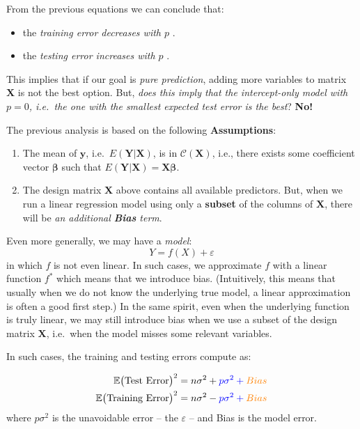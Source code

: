 \documentclass[
]{book}
\begin{document}
From the previous equations we can conclude that:

\begin{itemize}
\item
  the \emph{training error decreases with \(p\)} .
\item
  the \emph{testing error increases with \(p\)} .
\end{itemize}

This implies that if our goal is \emph{pure prediction}, adding more variables to matrix \(\mathbf{X}\) is not the best option. But, \emph{does this imply that the intercept-only model with \(p=0\), i.e.~the one with the smallest expected test error is the best}? \textbf{No!}

The previous analysis is based on the following \textbf{Assumptions}:

\begin{enumerate}
\def\labelenumi{\arabic{enumi}.}
\item
  The mean of \(\mathbf{y}\), i.e.~\(E(\mathbf{Y}|\mathbf{X})\), is in \(\mathcal{C}(\mathbf{X})\), i.e., there exists some coefficient vector \(\mathbf{\beta}\) such that \(E(\mathbf{Y}|\mathbf{X}) = \mathbf{X}\mathbf{\beta}\).
\item
  The design matrix \(\mathbf{X}\) above contains all available predictors. But, when we run a linear regression model using only a \textbf{subset} of the columns of \(\mathbf{X}\), there will be \emph{an additional \textbf{Bias} term}.
\end{enumerate}

Even more generally, we may have a \emph{model}:
\[Y = f(X) + \varepsilon\]
in which \(f\) is not even linear. In such cases, we approximate \(f\) with a linear function \(f^*\) which means that we introduce bias. (Intuitively, this means that usually when we do not know the underlying true model, a linear approximation is often a good first step.) In the same spirit, even when the underlying function is truly linear, we may still introduce bias when we use a subset of the design matrix \(\mathbf{X}\), i.e.~when the model misses some relevant variables.

In such cases, the training and testing errors compute as:

\begin{align*}
\mathbb{E}\bigl(\text{Test Error}\bigr)^2 &= n\sigma^2 + \color{blue}{p\sigma^2} + \color{orange}{Bias}\\
\mathbb{E}\bigl(\text{Training Error}\bigr)^2 &= n\sigma^2 - \color{blue}{p\sigma^2} + \color{orange}{Bias}
\end{align*}
where \(p\sigma^2\) is the unavoidable error -- the \(\varepsilon\) -- and Bias is the model error.
\end{document}
